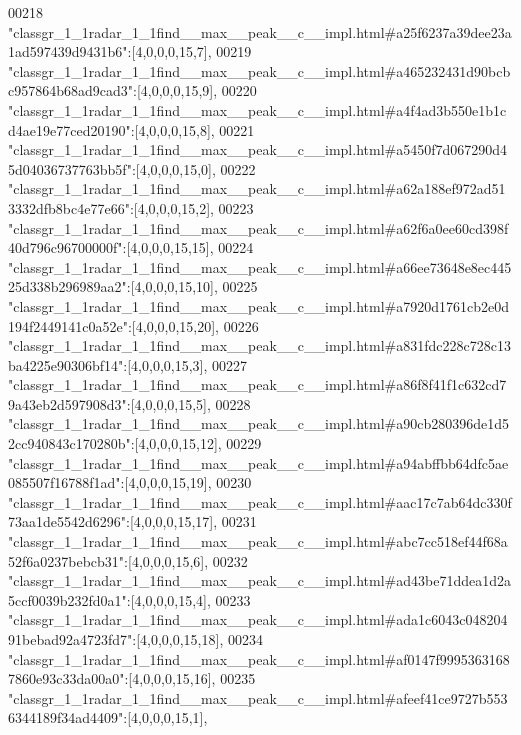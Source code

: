 \begin{DoxyCode}
00218 \textcolor{stringliteral}{"classgr\_1\_1radar\_1\_1find\_\_max\_\_peak\_\_c\_\_impl.html#a25f6237a39dee23a1ad597439d9431b6"}:[4,0,0,0,15,7],
00219 \textcolor{stringliteral}{"classgr\_1\_1radar\_1\_1find\_\_max\_\_peak\_\_c\_\_impl.html#a465232431d90bcbc957864b68ad9cad3"}:[4,0,0,0,15,9],
00220 \textcolor{stringliteral}{"classgr\_1\_1radar\_1\_1find\_\_max\_\_peak\_\_c\_\_impl.html#a4f4ad3b550e1b1cd4ae19e77ced20190"}:[4,0,0,0,15,8],
00221 \textcolor{stringliteral}{"classgr\_1\_1radar\_1\_1find\_\_max\_\_peak\_\_c\_\_impl.html#a5450f7d067290d45d04036737763bb5f"}:[4,0,0,0,15,0],
00222 \textcolor{stringliteral}{"classgr\_1\_1radar\_1\_1find\_\_max\_\_peak\_\_c\_\_impl.html#a62a188ef972ad513332dfb8bc4e77e66"}:[4,0,0,0,15,2],
00223 \textcolor{stringliteral}{"classgr\_1\_1radar\_1\_1find\_\_max\_\_peak\_\_c\_\_impl.html#a62f6a0ee60cd398f40d796c96700000f"}:[4,0,0,0,15,15],
00224 \textcolor{stringliteral}{"classgr\_1\_1radar\_1\_1find\_\_max\_\_peak\_\_c\_\_impl.html#a66ee73648e8ec44525d338b296989aa2"}:[4,0,0,0,15,10],
00225 \textcolor{stringliteral}{"classgr\_1\_1radar\_1\_1find\_\_max\_\_peak\_\_c\_\_impl.html#a7920d1761cb2e0d194f2449141c0a52e"}:[4,0,0,0,15,20],
00226 \textcolor{stringliteral}{"classgr\_1\_1radar\_1\_1find\_\_max\_\_peak\_\_c\_\_impl.html#a831fdc228c728c13ba4225e90306bf14"}:[4,0,0,0,15,3],
00227 \textcolor{stringliteral}{"classgr\_1\_1radar\_1\_1find\_\_max\_\_peak\_\_c\_\_impl.html#a86f8f41f1c632cd79a43eb2d597908d3"}:[4,0,0,0,15,5],
00228 \textcolor{stringliteral}{"classgr\_1\_1radar\_1\_1find\_\_max\_\_peak\_\_c\_\_impl.html#a90cb280396de1d52cc940843c170280b"}:[4,0,0,0,15,12],
00229 \textcolor{stringliteral}{"classgr\_1\_1radar\_1\_1find\_\_max\_\_peak\_\_c\_\_impl.html#a94abffbb64dfc5ae085507f16788f1ad"}:[4,0,0,0,15,19],
00230 \textcolor{stringliteral}{"classgr\_1\_1radar\_1\_1find\_\_max\_\_peak\_\_c\_\_impl.html#aac17c7ab64dc330f73aa1de5542d6296"}:[4,0,0,0,15,17],
00231 \textcolor{stringliteral}{"classgr\_1\_1radar\_1\_1find\_\_max\_\_peak\_\_c\_\_impl.html#abc7cc518ef44f68a52f6a0237bebcb31"}:[4,0,0,0,15,6],
00232 \textcolor{stringliteral}{"classgr\_1\_1radar\_1\_1find\_\_max\_\_peak\_\_c\_\_impl.html#ad43be71ddea1d2a5ccf0039b232fd0a1"}:[4,0,0,0,15,4],
00233 \textcolor{stringliteral}{"classgr\_1\_1radar\_1\_1find\_\_max\_\_peak\_\_c\_\_impl.html#ada1c6043c04820491bebad92a4723fd7"}:[4,0,0,0,15,18],
00234 \textcolor{stringliteral}{"classgr\_1\_1radar\_1\_1find\_\_max\_\_peak\_\_c\_\_impl.html#af0147f99953631687860e93c33da00a0"}:[4,0,0,0,15,16],
00235 \textcolor{stringliteral}{"classgr\_1\_1radar\_1\_1find\_\_max\_\_peak\_\_c\_\_impl.html#afeef41ce9727b5536344189f34ad4409"}:[4,0,0,0,15,1],

\end{DoxyCode}
